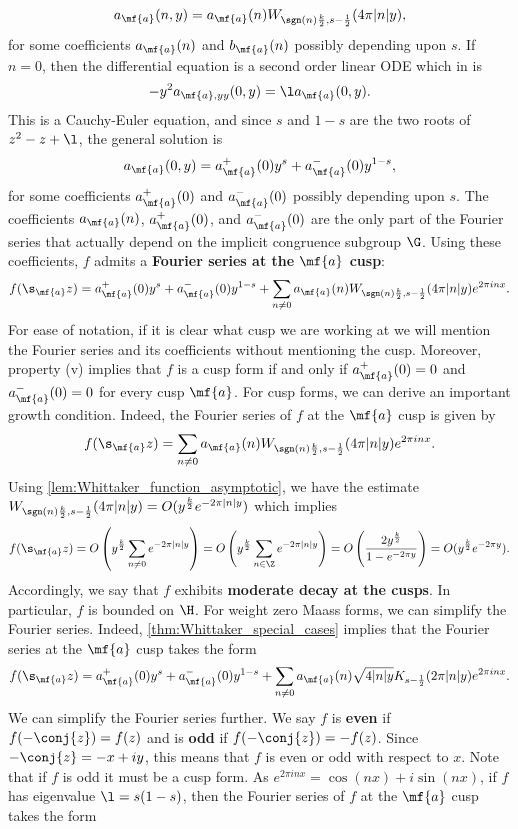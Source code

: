     \[
      a_{\mf{a}}(n,y) = a_{\mf{a}}(n)W_{\sgn(n)\frac{k}{2},s-\frac{1}{2}}(4\pi|n|y),
    \]
    for some coefficients $a_{\mf{a}}(n)$ and $b_{\mf{a}}(n)$ possibly depending upon $s$. If $n = 0$, then the differential equation is a second order linear ODE which in is
    \[
      -y^{2}a_{\mf{a},yy}(0,y) = \l a_{\mf{a}}(0,y).
    \]
    This is a Cauchy-Euler equation, and since $s$ and $1-s$ are the two roots of $z^{2}-z+\l$, the general solution is
    \[
      a_{\mf{a}}(0,y) = a_{\mf{a}}^{+}(0)y^{s}+a_{\mf{a}}^{-}(0)y^{1-s},
    \]
    for some coefficients $a_{\mf{a}}^{+}(0)$ and $a_{\mf{a}}^{-}(0)$ possibly depending upon $s$. The coefficients $a_{\mf{a}}(n)$, $a_{\mf{a}}^{+}(0)$, and $a_{\mf{a}}^{-}(0)$ are the only part of the Fourier series that actually depend on the implicit congruence subgroup $\G$. Using these coefficients, $f$ admits a \textbf{Fourier series at the $\mf{a}$ cusp}:
    \[
      f(\s_{\mf{a}}z) = a_{\mf{a}}^{+}(0)y^{s}+a_{\mf{a}}^{-}(0)y^{1-s}+\sum_{n \neq 0}a_{\mf{a}}(n)W_{\sgn(n)\frac{k}{2},s-\frac{1}{2}}(4\pi|n|y)e^{2\pi inx}.
    \]
    For ease of notation, if it is clear what cusp we are working at we will mention the Fourier series and its coefficients without mentioning the cusp. Moreover, property (v) implies that $f$ is a cusp form if and only if $a_{\mf{a}}^{+}(0) = 0$ and $a_{\mf{a}}^{-}(0) = 0$ for every cusp $\mf{a}$. For cusp forms, we can derive an important growth condition. Indeed, the Fourier series of $f$ at the $\mf{a}$ cusp is given by
    \[
      f(\s_{\mf{a}}z) = \sum_{n \neq 0}a_{\mf{a}}(n)W_{\sgn(n)\frac{k}{2},s-\frac{1}{2}}(4\pi|n|y)e^{2\pi inx}.
    \]
    Using \cref{lem:Whittaker_function_asymptotic}, we have the estimate $W_{\sgn(n)\frac{k}{2},s-\frac{1}{2}}(4\pi|n|y) = O(y^{\frac{k}{2}}e^{-2\pi|n|y})$ which implies
    \[
      f(\s_{\mf{a}}z) = O\left(y^{\frac{k}{2}}\sum_{n \neq 0}e^{-2\pi|n|y}\right) = O\left(y^{\frac{k}{2}}\sum_{n \in \Z}e^{-2\pi|n|y}\right) = O\left(\frac{2y^{\frac{k}{2}}}{1-e^{-2\pi y}}\right) = O(y^{\frac{k}{2}}e^{-2\pi y}).
    \]
    Accordingly, we say that $f$ exhibits \textbf{moderate decay at the cusps}. In particular, $f$ is bounded on $\H$. For weight zero Maass forms, we can simplify the Fourier series. Indeed, \cref{thm:Whittaker_special_cases} implies that the Fourier series at the $\mf{a}$ cusp takes the form
    \[
      f(\s_{\mf{a}}z) = a_{\mf{a}}^{+}(0)y^{s}+a_{\mf{a}}^{-}(0)y^{1-s}+\sum_{n \neq 0}a_{\mf{a}}(n)\sqrt{4|n|y}K_{s-\frac{1}{2}}(2\pi|n|y)e^{2\pi inx}.
    \]
    We can simplify the Fourier series further. We say $f$ is \textbf{even} if $f(-\conj{z}) = f(z)$ and is \textbf{odd} if $f(-\conj{z}) = -f(z)$. Since $-\conj{z} = -x+iy$, this means that $f$ is even or odd with respect to $x$. Note that if $f$ is odd it must be a cusp form. As $e^{2\pi inx} = \cos(nx)+i\sin(nx)$, if $f$ has eigenvalue $\l = s(1-s)$, then the Fourier series of $f$ at the $\mf{a}$ cusp takes the form
